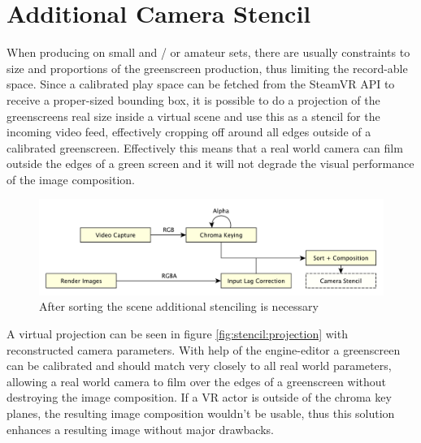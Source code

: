 %
\section{Additional Camera Stencil}

When producing on small and / or amateur sets, there are usually constraints to 
size and proportions of the greenscreen production, thus limiting the 
record-able space. Since a calibrated play space can be fetched from the 
SteamVR API to receive a proper-sized bounding box, it is possible to do a 
projection of the greenscreens real size inside a virtual scene and use this as 
a stencil for the incoming video feed, effectively cropping off around all 
edges outside of a calibrated greenscreen. Effectively this means that a real 
world camera can film outside the edges of a green screen and it will not 
degrade the visual performance of the image composition.

\begin{figure}[htb]
	\includegraphics[width=\textwidth]{_raw_resources/pipeline_steps/4_6_stencil.pdf}
	\caption{After sorting the scene additional stenciling is necessary}
	\label{fig:steps:stencil}
\end{figure}

A virtual projection can be seen in figure \ref{fig:stencil:projection} with 
reconstructed camera parameters. With help of the engine-editor a greenscreen 
can be calibrated and should match very closely to all real world parameters, 
allowing a real world camera to film over the edges of a greenscreen without 
destroying the image composition. If a VR actor is outside of the chroma key 
planes, the resulting image composition wouldn't be usable, thus this solution 
enhances a resulting image without major drawbacks.

